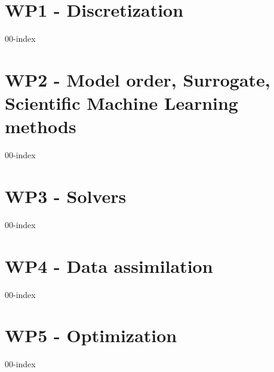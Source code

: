 \chapter{WP1 - Discretization}
\clearpage
{00-index}

\chapter{WP2 - Model order, Surrogate, Scientific Machine Learning methods}
\clearpage
{00-index}

\chapter{WP3 - Solvers}
\clearpage
{00-index}

\chapter{WP4 - Data assimilation}
\clearpage
{00-index}

\chapter{WP5 - Optimization}
\clearpage
{00-index}

